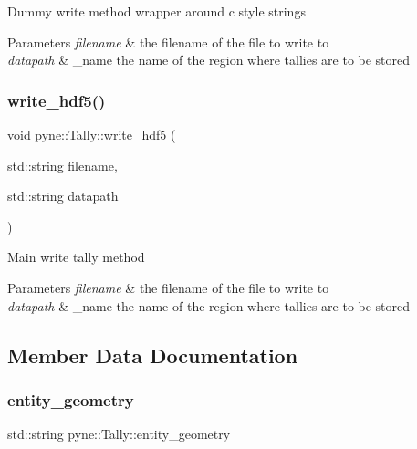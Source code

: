 Dummy write method wrapper around c style strings 
\begin{DoxyParams}{Parameters}
{\em filename} & the filename of the file to write to \\
\hline
{\em datapath} & \+\_\+name the name of the region where tallies are to be stored \\
\hline
\end{DoxyParams}
\mbox{\label{classpyne_1_1_tally_abc2ff249b426b47b2beb1bfeeacbbe62}} 
\subsubsection{\texorpdfstring{write\+\_\+hdf5()}{write\_hdf5()}\hspace{0.1cm}{\footnotesize\ttfamily [2/2]}}
{\footnotesize\ttfamily void pyne\+::\+Tally\+::write\+\_\+hdf5 (\begin{DoxyParamCaption}\item[{std\+::string}]{filename,  }\item[{std\+::string}]{datapath }\end{DoxyParamCaption})}

Main write tally method 
\begin{DoxyParams}{Parameters}
{\em filename} & the filename of the file to write to \\
\hline
{\em datapath} & \+\_\+name the name of the region where tallies are to be stored \\
\hline
\end{DoxyParams}


\subsection{Member Data Documentation}
\mbox{\label{classpyne_1_1_tally_a297bfdf2ab5822812c7c1b5c4eb03a2a}} 
\subsubsection{\texorpdfstring{entity\+\_\+geometry}{entity\_geometry}}
{\footnotesize\ttfamily std\+::string pyne\+::\+Tally\+::entity\+\_\+geometry}



